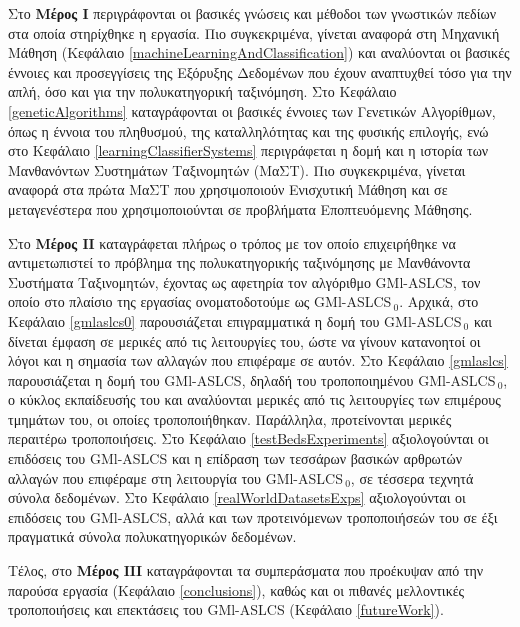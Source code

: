 Στο \textbf{Μέρος Ι} περιγράφονται οι βασικές γνώσεις και μέθοδοι των γνωστικών πεδίων στα οποία στηρίχθηκε η εργασία. Πιο συγκεκριμένα, γίνεται αναφορά στη Μηχανική Μάθηση (Κεφάλαιο \ref{machineLearningAndClassification}) και αναλύονται οι βασικές έννοιες και προσεγγίσεις της Εξόρυξης Δεδομένων που έχουν αναπτυχθεί τόσο για την απλή, όσο και για την πολυκατηγορική ταξινόμηση. Στο Κεφάλαιο \ref{geneticAlgorithms} καταγράφονται οι βασικές έννοιες των Γενετικών Αλγορίθμων, όπως η έννοια του πληθυσμού, της καταλληλότητας και της φυσικής επιλογής, ενώ στο Κεφάλαιο \ref{learningClassifierSystems} περιγράφεται η δομή και η ιστορία των Μανθανόντων Συστημάτων Ταξινομητών (ΜαΣΤ). Πιο συγκεκριμένα, γίνεται αναφορά στα πρώτα ΜαΣΤ που χρησιμοποιούν Ενισχυτική Μάθηση και σε μεταγενέστερα που χρησιμοποιούνται σε προβλήματα Εποπτευόμενης Μάθησης.

Στο \textbf{Μέρος ΙΙ} καταγράφεται πλήρως ο τρόπος με τον οποίο επιχειρήθηκε να αντιμετωπιστεί το πρόβλημα της πολυκατηγορικής ταξινόμησης με Μανθάνοντα Συστήματα Ταξινομητών, έχοντας ως αφετηρία τον αλγόριθμο GMl-ASLCS, τον οποίο στο πλαίσιο της εργασίας ονοματοδοτούμε ως GMl-ASLCS$_{\:0}$. Αρχικά, στο Κεφάλαιο \ref{gmlaslcs0} παρουσιάζεται επιγραμματικά η δομή του GMl-ASLCS$_{\:0}$ και δίνεται έμφαση σε μερικές από τις λειτουργίες του, ώστε να γίνουν κατανοητοί οι λόγοι και η σημασία των αλλαγών που επιφέραμε σε αυτόν. Στο Κεφάλαιο \ref{gmlaslcs} παρουσιάζεται η δομή του GMl-ASLCS, δηλαδή του τροποποιημένου GMl-ASLCS$_{\:0}$, ο κύκλος εκπαίδευσής του και αναλύονται μερικές από τις λειτουργίες των επιμέρους τμημάτων του, οι οποίες τροποποιήθηκαν. Παράλληλα, προτείνονται μερικές περαιτέρω τροποποιήσεις. Στο Κεφάλαιο \ref{testBedsExperiments} αξιολογούνται οι επιδόσεις του GMl-ASLCS και η επίδραση των τεσσάρων βασικών αρθρωτών αλλαγών που επιφέραμε στη λειτουργία του GMl-ASLCS$_{\:0}$, σε τέσσερα τεχνητά σύνολα δεδομένων. Στο Κεφάλαιο \ref{realWorldDatasetsExps} αξιολογούνται οι επιδόσεις του GMl-ASLCS, αλλά και των προτεινόμενων τροποποιήσεών του σε έξι πραγματικά σύνολα πολυκατηγορικών δεδομένων.

Τέλος, στο \textbf{Μέρος ΙΙΙ} καταγράφονται τα συμπεράσματα που προέκυψαν από την παρούσα εργασία (Κεφάλαιο \ref{conclusions}), καθώς και οι πιθανές μελλοντικές τροποποιήσεις και επεκτάσεις του GMl-ASLCS (Κεφάλαιο \ref{futureWork}).